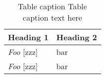 \begin{table}
\caption{{Table caption} Table caption text here}
\centering
\begin{small}
\begin{tabular}{ll}

\toprule

\textbf{Heading 1}  & \textbf{Heading 2} \\
\midrule
\emph{Foo} [zzz] & bar \\
\emph{Foo} [zzz] & bar \\

\bottomrule
\end{tabular}
\end{small}
\label{tab:1}
\end{table}
